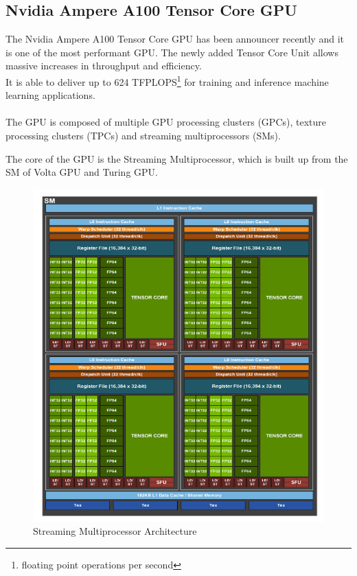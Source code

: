 \subsection{Nvidia Ampere A100 Tensor Core GPU}
The Nvidia Ampere A100 Tensor Core GPU has been announcer recently and it is one of the most performant GPU. The newly added Tensor Core Unit allows massive increases in throughput and efficiency.\\It is able to deliver up to 624 TFPLOPS\footnote{floating point operations per second} for training and inference machine learning applications.\\\\

The GPU is composed of multiple GPU processing clusters (GPCs), texture processing clusters (TPCs) and streaming multiprocessors (SMs).

The core of the GPU is the Streaming Multiprocessor, which is built up from the SM of Volta GPU and Turing GPU.
\begin{figure}[!htbp]
\centering
\captionsetup{justification=centering}
\includegraphics[scale=0.8]{./figure/volta_sm_arch.PNG}
\caption{Streaming Multiprocessor Architecture \cite{paper:41}}
\label{fig:voltasmarch}
\end{figure}


